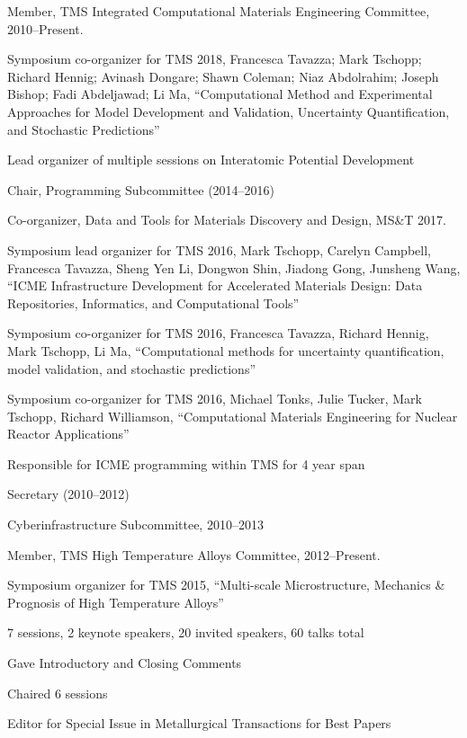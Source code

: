 \begin{list2}
\item Member, TMS Integrated Computational Materials Engineering Committee, 2010--Present.
\begin{list2}
\item	Symposium co-organizer for TMS 2018, Francesca Tavazza; Mark Tschopp; Richard Hennig; Avinash Dongare; Shawn Coleman; Niaz Abdolrahim; Joseph Bishop; Fadi Abdeljawad; Li Ma, ``Computational Method and Experimental Approaches for Model Development and Validation, Uncertainty Quantification, and Stochastic Predictions''
\item Lead organizer of multiple sessions on Interatomic Potential Development

\item Chair, Programming Subcommittee (2014--2016)
\begin{list2}
\item Co-organizer, Data and Tools for Materials Discovery and Design, MS\&T 2017.
\item	Symposium lead organizer for TMS 2016, Mark Tschopp, Carelyn Campbell, Francesca Tavazza, Sheng Yen Li, Dongwon Shin, Jiadong Gong, Junsheng Wang, ``ICME Infrastructure Development for Accelerated Materials Design: Data Repositories, Informatics, and Computational Tools''
\item	Symposium co-organizer for TMS 2016, Francesca Tavazza, Richard Hennig, Mark Tschopp, Li Ma, ``Computational methods for uncertainty quantification, model validation, and stochastic predictions''
\item	Symposium co-organizer for TMS 2016, Michael Tonks, Julie Tucker, Mark Tschopp, Richard Williamson, ``Computational Materials Engineering for Nuclear Reactor Applications''
\item Responsible for ICME programming within TMS for 4 year span
\end{list2}
\item Secretary (2010--2012)
\item Cyberinfrastructure Subcommittee, 2010--2013
\end{list2}

\item Member, TMS High Temperature Alloys Committee, 2012--Present.
\begin{list2}
\item	Symposium organizer for TMS 2015, ``Multi-scale Microstructure, Mechanics \& Prognosis of High Temperature Alloys''
\begin{list2}
\item  7 sessions, 2 keynote speakers, 20 invited speakers, 60 talks total
\item  Gave Introductory and Closing Comments
\item  Chaired 6 sessions
\item  Editor for Special Issue in Metallurgical Transactions for Best Papers
\end{list2}
\end{list2}


\end{list2}
